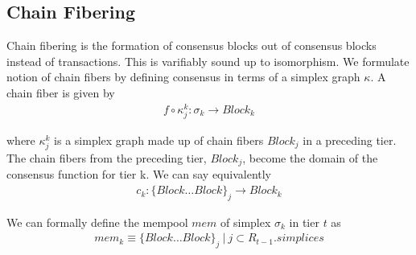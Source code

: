 \documentclass{article}
\begin{document}
\subsection{Chain Fibering}
Chain fibering is the formation of consensus blocks out of consensus blocks instead of transactions. This is varifiably sound up to isomorphism. We formulate notion of chain fibers by defining consensus in terms of a simplex graph $\kappa$. A chain fiber is given by 
\begin{equation} \label{eq1}
\begin{split}
f \circ \kappa_j^{k}: \sigma_k  \rightarrow Block_k
\end{split}
\end{equation}

where $\kappa_j^{k}$ is a simplex graph made up of chain fibers $Block_j$ in a preceding tier. The chain fibers from the preceding tier, $Block_j$, become the domain of the consensus function for tier k. We can say equivalently
\begin{equation} \label{eq1}
\begin{split}
c_k: \{Block \dots Block\}_j \rightarrow Block_k
\end{split}
\end{equation}

We can formally define the mempool $mem$ of simplex $\sigma_k$ in tier $t$ as 
\begin{equation} \label{eq1}
\begin{split}
mem_k \equiv \{Block \dots Block\}_j \ | \ j \subset R_{t-1}.simplices
\end{split}
\end{equation}


\end{document}
